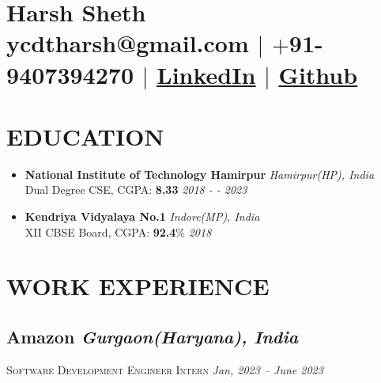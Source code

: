 \documentclass[10pt]{article}
\begin{document}
\section{\Huge{Harsh Sheth}\\ \large \normalfont ycdtharsh@gmail.com $|$ \normalfont $+$91-9407394270 $|$  \underline{\href{https://www.linkedin.com/in/harsh-sheth-2101}{LinkedIn}} $|$ \underline{\href{https://github.com/harsh-sheth}{Github}}}

\section{EDUCATION}
\begin{itemize}
  \item{
      \textbf{National Institute of Technology Hamirpur} \hfill \textit{Hamirpur(HP), India}\\
      Dual Degree CSE, CGPA: \textbf{8.33} \hfill \textit{2018 - - 2023}
  } 
  \item{
      \textbf{Kendriya Vidyalaya No.1} \hfill \textit{Indore(MP), India}\\
      XII CBSE Board, CGPA: \textbf{92.4}\% \hfill \textit{2018}
  }
\end{itemize}


\section{WORK EXPERIENCE}
\subsection*{Amazon \hfill \normalsize \normalfont \textit{Gurgaon(Haryana), India}}

\vspace{-1ex}
\textsc{\textmd{Software Development Engineer Intern}} \hfill \normalsize \textit{Jan, 2023 -- June 2023}
\vspace{-1ex}
\end{document}
